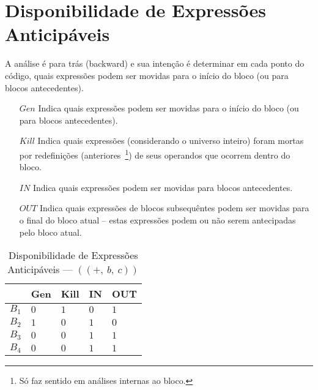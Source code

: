 \section{Disponibilidade de Express\~oes Anticip\'aveis}

A an\'alise \'e para tr\'as (\textsf{backward}) e sua inten\c{c}\~ao \'e determinar em cada ponto do c\'odigo, quais express\~oes podem ser movidas para o in\'icio do bloco (ou para blocos antecedentes).
\begin{itemize}
  \item[$Gen$] Indica quais express\~oes podem ser movidas para o in\'icio do bloco (ou para blocos antecedentes).
  \item[$Kill$] Indica quais express\~oes (considerando o universo inteiro) foram mortas por redefini\c{c}\~oes (anteriores~\footnote{S\'o faz sentido em an\'alises internas ao bloco.}) de seus operandos que ocorrem dentro do bloco.
  \item[$IN$] Indica quais express\~oes podem ser movidas para blocos antecedentes.
  \item[$OUT$] Indica quais express\~oes de blocos subsequ\^entes podem ser movidas para o final do bloco atual -- estas express\~oes podem ou n\~ao serem antecipadas pelo bloco atual.
\end{itemize}

\begin{table}[ht]
\centering
\begin{tabular}{l|l|l|l|l}
	& Gen & Kill & IN & OUT\\
\hline
$B_{1}$ &  $0$ & $1$ & $0$ & $1$\\
$B_{2}$ &  $1$ & $0$ & $1$ & $0$\\
$B_{3}$ &  $0$ & $0$ & $1$ & $1$\\
$B_{4}$ &  $0$ & $0$ & $1$ & $1$\\
\end{tabular}
\caption{Disponibilidade de Express\~oes Anticip\'aveis --- $((+,\:b,\:c))$}
\end{table}

